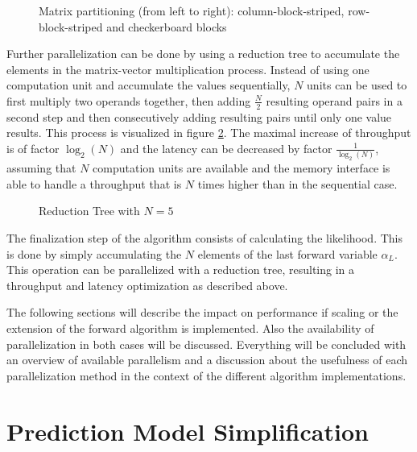 \documentclass[mscthesis]{usiinfthesis}
\begin{document}
\begin{figure}
    \centering
    
    \caption{Matrix partitioning (from left to right): column-block-striped,
        row-block-striped and checkerboard blocks}
    \label{fig:matrix_partitioning}
\end{figure}

Further parallelization can be done by using a reduction tree to accumulate the
elements in the matrix-vector multiplication process. Instead of using one
computation unit and accumulate the values sequentially, $N$ units can be used
to first multiply two operands together, then adding $\frac{N}{2}$ resulting
operand pairs in a second step and then consecutively adding resulting pairs
until only one value results. This process is visualized in figure
\ref{fig:red_tree}. The maximal increase of throughput is of factor $\log_2(N)$
and the latency can be decreased by factor $\frac{1}{\log_2(N)}$, assuming that
$N$ computation units are available and the memory interface is able to handle
a throughput that is $N$ times higher than in the sequential case.

\begin{figure}
    \centering
    
    \caption{Reduction Tree with $N=5$}
    \label{fig:red_tree}
\end{figure}

The finalization step of the algorithm consists of calculating the likelihood.
This is done by simply accumulating the $N$ elements of the last forward
variable $\alpha_L$. This operation can be parallelized with a reduction tree,
resulting in a throughput and latency optimization as described above.

The following sections will describe the impact on performance if scaling or
the extension of the forward algorithm is implemented. Also the availability of
parallelization in both cases will be discussed. Everything will be concluded
with an overview of available parallelism and a discussion about the usefulness
of each parallelization method in the context of the different algorithm
implementations.

\section{Prediction Model Simplification}
\label{ch:analysis_simple}
\end{document}
